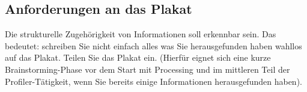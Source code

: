 \documentclass[loesung]{schulein}
\begin{document}
%
\begin{aufgabenbox}{}{}
\vspace*{-1em}
\subsection*{Anforderungen an das Plakat}
Die strukturelle Zugehörigkeit von Informationen soll erkennbar sein. Das bedeutet: schreiben Sie nicht einfach alles was Sie herausgefunden haben wahllos auf das Plakat. Teilen Sie das Plakat ein. (Hierfür eignet sich eine kurze Brainstorming-Phase vor dem Start mit Processing und im mittleren Teil der Profiler-Tätigkeit, wenn Sie bereits einige Informationen herausgefunden haben).
\end{aufgabenbox}
\end{document}
